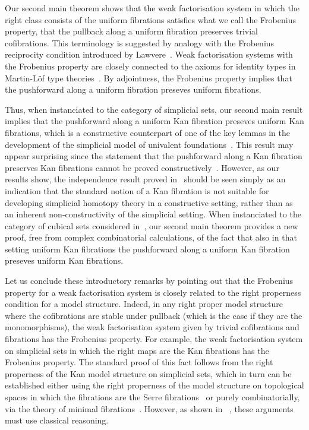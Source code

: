 \documentclass[reqno,10pt,a4paper,oneside]{amsart}
\begin{document}
Our second main theorem shows that the weak factorisation system in which the right class consists of the uniform fibrations satisfies what we call the Frobenius property, \ie that the pullback along a uniform fibration preserves trivial cofibrations.  This terminology is suggested by analogy with the Frobenius reciprocity condition introduced by 
Lawvere~\cite{lawvere-1969}. Weak factorisation systems with the Frobenius property are closely connected to the axioms for identity types in Martin-L\"of type theories~\cite[Section~4]{gambino-garner:idtypewfs}.
By adjointness,  the Frobenius property implies that the pushforward along a uniform fibration preseves uniform fibrations. 

Thus, when instanciated to the category of simplicial sets, our second main result implies that the  pushforward along a uniform Kan fibration preseves uniform Kan fibrations, which is a constructive counterpart of 
one of the key lemmas in the development of the simplicial model of univalent foundations~\cite[Lemma 2.3.1]{voevodsky-simplicial-model}. 
This result may appear surprising since the statement that the pushforward  along a Kan fibration 
preserves Kan fibrations cannot be proved constructively~\cite{coquand-non-constructivity-kan}.
However, as our results show, the independence result proved in~\cite{coquand-non-constructivity-kan}
should be seen  simply as an indication that the standard notion of a Kan 
fibration is not suitable for developing simplicial homotopy theory in a constructive setting, rather than 
as an inherent non-constructivity of the simplicial setting. When instanciated to the category of cubical
sets considered in~\cite{coquand-variation}, our second main theorem provides a new proof, free from
complex combinatorial calculations, of the fact that also in that setting uniform Kan fibrations  the  
pushforward along a uniform Kan fibration preseves uniform Kan fibrations. 

Let us conclude these introductory remarks by pointing out that the Frobenius property for a 
weak factorisation system is closely related to the right properness condition for a model 
structure. Indeed, in any right proper model structure where the cofibrations are stable under
pullback (which is the case if they are the monomorphisms), the weak factorisation system 
given by trivial cofibrations and fibrations has the Frobenius property. For example, the weak factorisation system on simplicial sets in which the right maps are the Kan fibrations has the Frobenius property. 
The standard proof of this fact follows from the right properness of the Kan model structure on simplicial
sets, which in turn can be established either using the right properness of the model structure on topological spaces in which  the fibrations are the Serre fibrations~\cite[Theorem~13.1.13]{hirschhorn-model-localizations} or purely combinatorially, via the theory of minimal fibrations~\cite[Theorem~1.7.1]{joyal-tierney-notes}. However,
as shown in ~\cite{coquand-non-constructivity-kan}, these arguments must use classical reasoning.
\end{document}
